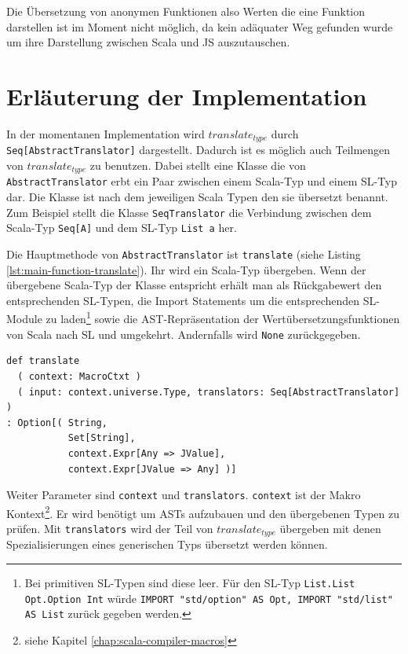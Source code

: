 \documentclass[12pt,bibtotoc]{scrreprt}
\begin{document}
Die Übersetzung von anonymen Funktionen also Werten die eine Funktion darstellen ist im Moment nicht möglich, da kein adäquater Weg gefunden wurde um ihre Darstellung zwischen Scala und JS auszutauschen.

\section{Erläuterung der Implementation}
\label{sec:trans-implementation}

In der momentanen Implementation wird $translate_{type}$ durch \lstinline!Seq[AbstractTranslator]! dargestellt. Dadurch ist es möglich auch Teilmengen von $translate_{type}$ zu benutzen. Dabei stellt eine Klasse die von \lstinline!AbstractTranslator! erbt ein Paar zwischen einem Scala-Typ und einem SL-Typ dar. Die Klasse ist nach dem jeweiligen Scala Typen den sie übersetzt benannt. Zum Beispiel stellt die Klasse \lstinline!SeqTranslator! die Verbindung zwischen dem Scala-Typ \lstinline!Seq[A]! und dem SL-Typ \lstinline!List a! her. 

Die Hauptmethode von \lstinline!AbstractTranslator! ist \lstinline!translate! (siehe Listing \ref{lst:main-function-translate}). Ihr wird ein Scala-Typ übergeben. Wenn der übergebene Scala-Typ der Klasse entspricht erhält man als Rückgabewert den entsprechenden SL-Typen, die Import Statements um die entsprechenden SL-Module zu laden\footnote{Bei primitiven SL-Typen sind diese leer. Für den SL-Typ \lstinline!List.List Opt.Option Int! würde \lstinline!IMPORT "std/option" AS Opt, IMPORT "std/list" AS List! zurück gegeben werden.} sowie die \ac{AST}-Repräsentation der Wertübersetzungsfunktionen von Scala nach SL und umgekehrt. Andernfalls wird \lstinline!None! zurückgegeben.

\begin{lstlisting}[caption=Hauptfunktion in AbstractTranslator, label=lst:main-function-translate]
def translate
  ( context: MacroCtxt )
  ( input: context.universe.Type, translators: Seq[AbstractTranslator] )
: Option[( String, 
           Set[String], 
           context.Expr[Any => JValue], 
           context.Expr[JValue => Any] )]
\end{lstlisting}

Weiter Parameter sind \lstinline!context! und \lstinline!translators!. \lstinline!context! ist der Makro Kontext\footnote{siehe Kapitel \ref{chap:scala-compiler-macros}}. Er wird benötigt um \ac{AST}s aufzubauen und den übergebenen Typen zu prüfen. Mit \lstinline!translators! wird der Teil von $translate_{type}$ übergeben mit denen Spezialisierungen eines generischen Typs übersetzt werden können.
\end{document}
